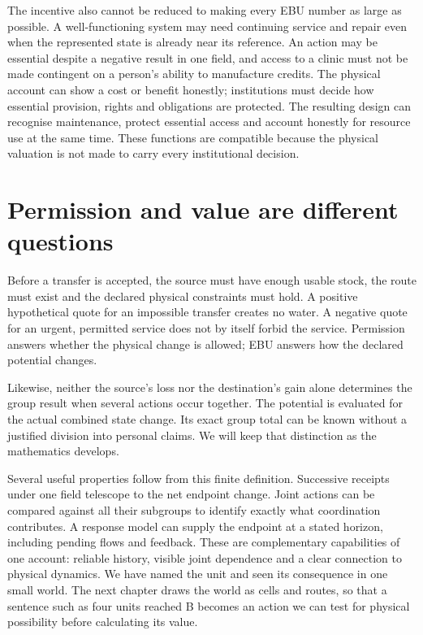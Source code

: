 The incentive also cannot be reduced to making every EBU number as large as possible. A well-functioning system may need continuing service and repair even when the represented state is already near its reference. An action may be essential despite a negative result in one field, and access to a clinic must not be made contingent on a person's ability to manufacture credits. The physical account can show a cost or benefit honestly; institutions must decide how essential provision, rights and obligations are protected. The resulting design can recognise maintenance, protect essential access and account honestly for resource use at the same time. These functions are compatible because the physical valuation is not made to carry every institutional decision.

\section{Permission and value are different questions}
Before a transfer is accepted, the source must have enough usable stock, the route must exist and the declared physical constraints must hold. A positive hypothetical quote for an impossible transfer creates no water. A negative quote for an urgent, permitted service does not by itself forbid the service. Permission answers whether the physical change is allowed; EBU answers how the declared potential changes.

Likewise, neither the source's loss nor the destination's gain alone determines the group result when several actions occur together. The potential is evaluated for the actual combined state change. Its exact group total can be known without a justified division into personal claims. We will keep that distinction as the mathematics develops.

Several useful properties follow from this finite definition. Successive receipts under one field telescope to the net endpoint change. Joint actions can be compared against all their subgroups to identify exactly what coordination contributes. A response model can supply the endpoint at a stated horizon, including pending flows and feedback. These are complementary capabilities of one account: reliable history, visible joint dependence and a clear connection to physical dynamics. We have named the unit and seen its consequence in one small world. The next chapter draws the world as cells and routes, so that a sentence such as four units reached B becomes an action we can test for physical possibility before calculating its value.
